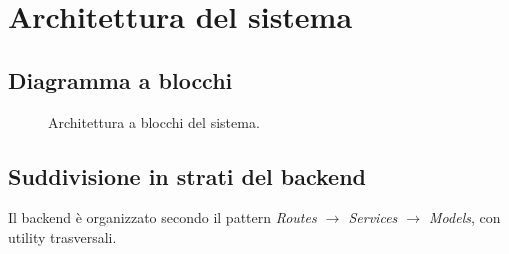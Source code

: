 \section{Architettura del sistema}

\subsection{Diagramma a blocchi}
\begin{figure}[H]
    \centering
    \caption{Architettura a blocchi del sistema.}
    \label{fig:arch}
\end{figure}

\subsection{Suddivisione in strati del backend}
Il backend è organizzato secondo il pattern \emph{Routes $\to$ Services $\to$
Models}, con utility trasversali.

